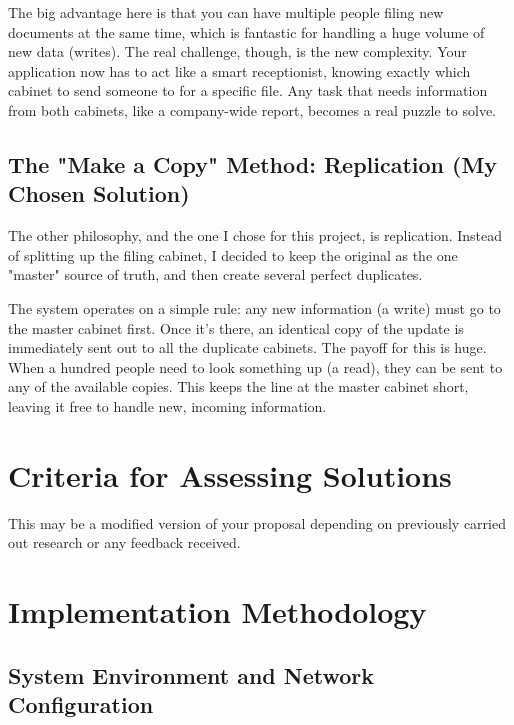 \documentclass[conference]{IEEEtran}
\begin{document}
The big advantage here is that you can have multiple people filing new documents at the same time, which is fantastic for handling a huge volume of new data (writes). The real challenge, though, is the new complexity. Your application now has to act like a smart receptionist, knowing exactly which cabinet to send someone to for a specific file. Any task that needs information from both cabinets, like a company-wide report, becomes a real puzzle to solve.

\subsection{The "Make a Copy" Method: Replication (My Chosen Solution)}
The other philosophy, and the one I chose for this project, is replication. Instead of splitting up the filing cabinet, I decided to keep the original as the one "master" source of truth, and then create several perfect duplicates.

The system operates on a simple rule: any new information (a write) must go to the master cabinet first. Once it's there, an identical copy of the update is immediately sent out to all the duplicate cabinets. The payoff for this is huge. When a hundred people need to look something up (a read), they can be sent to any of the available copies. This keeps the line at the master cabinet short, leaving it free to handle new, incoming information.


\section{Criteria for Assessing Solutions} \label{sec:criteria}
This may be a modified version of your proposal depending on previously carried out research or any feedback received.  



\section{Implementation Methodology}

\subsection{System Environment and Network Configuration}
%
%
%
\end{document}
